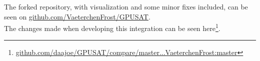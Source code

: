 \documentclass[a4paper, 12pt, bibliography=totoc]{scrartcl}
\begin{document}
%	
The forked repository, with visualization and some minor fixes included, can be seen on \url{github.com/VaeterchenFrost/GPUSAT}. \\
The changes made when developing this integration can be seen here\footnote{\url{github.com/daajoe/GPUSAT/compare/master...VaeterchenFrost:master}}.

\end{document}
